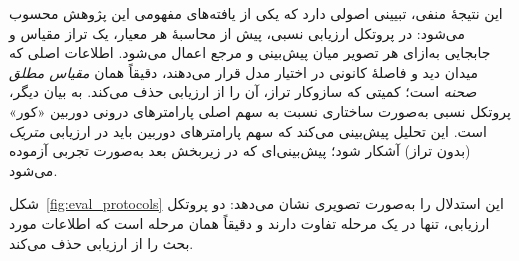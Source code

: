 این نتیجهٔ منفی، تبیینی اصولی دارد که یکی از یافته‌های مفهومی این پژوهش محسوب می‌شود: در پروتکل ارزیابی نسبی، پیش از محاسبهٔ هر معیار، یک تراز مقیاس و جابجایی به‌ازای هر تصویر میان پیش‌بینی و مرجع اعمال می‌شود. اطلاعات اصلی که میدان دید و فاصلهٔ کانونی در اختیار مدل قرار می‌دهند، دقیقاً همان \emph{مقیاس مطلق صحنه} است؛ کمیتی که سازوکار تراز، آن را از ارزیابی حذف می‌کند. به بیان دیگر، پروتکل نسبی به‌صورت ساختاری نسبت به سهم اصلی پارامترهای درونی دوربین «کور» است. این تحلیل پیش‌بینی می‌کند که سهم پارامترهای دوربین باید در ارزیابی \emph{متریک} (بدون تراز) آشکار شود؛ پیش‌بینی‌ای که در زیربخش بعد به‌صورت تجربی آزموده می‌شود.

شکل~\ref{fig:eval_protocols} این استدلال را به‌صورت تصویری نشان می‌دهد:
دو پروتکل ارزیابی، تنها در یک مرحله تفاوت دارند و دقیقاً همان مرحله است که
اطلاعات مورد بحث را از ارزیابی حذف می‌کند.


